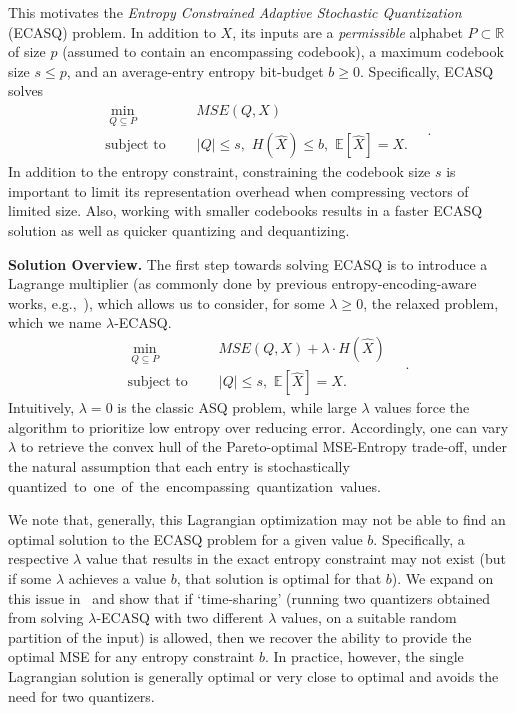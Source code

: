 \documentclass[11pt,letterpaper]{article}
\newcommand{\E}{\mathbb{E}}
\begin{document}
This motivates the \emph{Entropy Constrained Adaptive Stochastic Quantization} (ECASQ) problem. In addition to $X$, its inputs are a \textit{permissible} alphabet $P\subset\mathbb R$ of size $p$ (assumed to contain an encompassing codebook), a maximum codebook size $s\le p$, and an average-entry entropy bit-budget $b\ge0$. Specifically, ECASQ solves
\begin{equation*}
\begin{aligned}
&\min_{Q \subseteq P} \qquad\qquad MSE(Q,X) \\
&\text{subject to}  \  \qquad |Q| \leq s, \,\, H(\widehat X) \leq b,\,\, \E[\widehat X]=X.%
\end{aligned} \quad.
\end{equation*}
In addition to the entropy constraint, constraining the codebook size $s$ is important to limit its representation overhead when compressing vectors of limited size. Also, working with smaller codebooks results in a faster ECASQ solution as well as quicker quantizing and dequantizing.

\textbf{Solution Overview.}
The first step towards solving ECASQ is to introduce a Lagrange multiplier (as commonly done by previous entropy-encoding-aware works, e.g.,~\cite{gish1968asymptotically, chou1989entropy}), which allows us to consider, for some $\lambda \ge 0$, the relaxed problem, which we name $\lambda$-ECASQ.
\begin{equation*}
\begin{aligned}
&\min_{Q \subseteq P} \qquad\qquad MSE(Q,X)+ \lambda\cdot H(\widehat X) \\
&\text{subject to}  \  \qquad |Q| \leq s, \,\, \E[\widehat X]=X.%
\end{aligned}\label{eq:obj} \quad.
\end{equation*}
Intuitively, $\lambda=0$ is the classic ASQ problem, while large $\lambda$ values force the algorithm to prioritize low entropy over reducing error. Accordingly, one 
can vary $\lambda$ to retrieve the convex hull of the Pareto-optimal MSE-Entropy trade-off, under the natural assumption that each entry is stochastically \mbox{quantized to one of the encompassing quantization values.}

We note that, generally, this Lagrangian optimization may not be able to find an optimal solution to the ECASQ problem for a given value $b$. Specifically, a respective $\lambda$ value that results in the exact entropy constraint may not exist (but if some $\lambda$ achieves a value $b$, that solution is optimal for that $b$). We expand on this issue in~ and show that if `time-sharing' (running two quantizers obtained from solving $\lambda$-ECASQ with two different $\lambda$ values, on a suitable random partition of the input) is allowed, then we recover the ability to provide the optimal MSE for any entropy constraint $b$. In practice, however, the single Lagrangian solution is generally optimal or very close to optimal and avoids the need for two quantizers.
\end{document}

